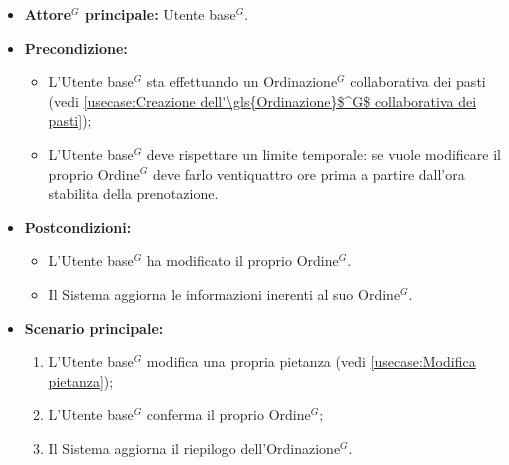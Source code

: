 \label{usecase:Modifica della propria \gls{Ordinazione}$^G$}
\begin{itemize}
	\item \textbf{\gls{Attore}$^G$ principale:} \gls{Utente base}$^G$.

	\item \textbf{Precondizione:}
	      \begin{itemize}
		      \item L'\gls{Utente base}$^G$ sta effettuando un \gls{Ordinazione}$^G$ collaborativa dei pasti (vedi \autoref{usecase:Creazione dell'\gls{Ordinazione}$^G$ collaborativa dei pasti});
		      \item L'\gls{Utente base}$^G$ deve rispettare un limite temporale: se vuole modificare il proprio \gls{Ordine}$^G$ deve farlo ventiquattro ore prima a partire dall'ora stabilita della prenotazione.
	      \end{itemize}

	\item \textbf{Postcondizioni:}
	      \begin{itemize}
		      \item L'\gls{Utente base}$^G$ ha modificato il proprio \gls{Ordine}$^G$.
		      \item Il Sistema aggiorna le informazioni inerenti al suo \gls{Ordine}$^G$.
	      \end{itemize}

	\item \textbf{Scenario principale:}
	      \begin{enumerate}
		      \item L'\gls{Utente base}$^G$ modifica una propria pietanza (vedi \autoref{usecase:Modifica pietanza});
		      \item L'\gls{Utente base}$^G$ conferma il proprio \gls{Ordine}$^G$;
		      \item Il Sistema aggiorna il riepilogo dell'\gls{Ordinazione}$^G$.
	      \end{enumerate}
\end{itemize}

